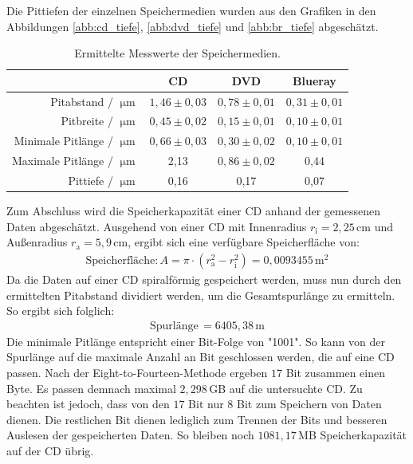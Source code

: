 Die Pittiefen der einzelnen Speichermedien wurden aus den Grafiken in den Abbildungen \ref{abb:cd_tiefe}, \ref{abb:dvd_tiefe} und \ref{abb:br_tiefe} abgesch\"atzt.
\begin{table}
	\centering
	\caption{Ermittelte Messwerte der Speichermedien.}
\begin{tabular}{|r|ccc|}
	\hline
	{} & {CD} & {DVD} & {Blueray} \\
	\hline
	Pitabstand / $\upmu \text{m}$ & $1,46 \pm 0,03$ & $0,78 \pm 0,01$ & $0,31 \pm 0,01$ \\
	Pitbreite	/ $\upmu \text{m}$ &	$0,45 \pm 0,02$ & $0,15 \pm 0,01$ & $0,10 \pm 0,01$ \\
	Minimale Pitlänge / $\upmu \text{m}$ & $0,66 \pm 0,03$ & $0,30 \pm 0,02$ & $0,10 \pm 0,01$ \\
	Maximale Pitlänge / $\upmu \text{m}$ & 2,13 & $0,86 \pm 0,02$ & 0,44 \\
	Pittiefe / $\upmu \text{m}$ & 0,16 & 0,17 & 0,07 \\
	\hline
\end{tabular}
\label{tab:auf2}
\end{table}
Zum Abschluss wird die Speicherkapazit\"at einer CD anhand der gemessenen Daten abgesch\"atzt.
Ausgehend von einer CD mit Innenradius $r_{\text{i}} = 2,25 \, \text{cm}$ und Au{\ss}enradius $r_{\text{a}} = 5,9 \, \text{cm}$, ergibt sich eine verf\"ugbare Speicherfl\"ache von:
\begin{align*}
	\text{Speicherfl\"ache:} \, A = \pi \cdot \left( r_{\text{a}}^2 - r_{\text{i}}^2 \right) = 0,0093455 \, \text{m}^2
\end{align*}
Da die Daten auf einer CD spiralf\"ormig gespeichert werden, muss nun durch den ermittelten Pitabstand dividiert werden, um die Gesamtspurl\"ange zu ermitteln.
So ergibt sich folglich:
\begin{align*}
	\text{Spurl\"ange} \, = 6405,38 \, \text{m}
\end{align*}
Die minimale Pitl\"ange entspricht einer Bit-Folge von "1001".
So kann von der Spurl\"ange auf die maximale Anzahl an Bit geschlossen werden, die auf eine CD passen.
Nach der Eight-to-Fourteen-Methode ergeben $17$ Bit zusammen einen Byte.
Es passen demnach maximal $2,298 \,$GB auf die untersuchte CD.
Zu beachten ist jedoch, dass von den $17$ Bit nur $8$ Bit zum Speichern von Daten dienen.
Die restlichen Bit dienen lediglich zum Trennen  der Bits und besseren Auslesen der gespeicherten Daten.
So bleiben noch $1081,17 \,$MB Speicherkapazit\"at auf der CD \"ubrig.

